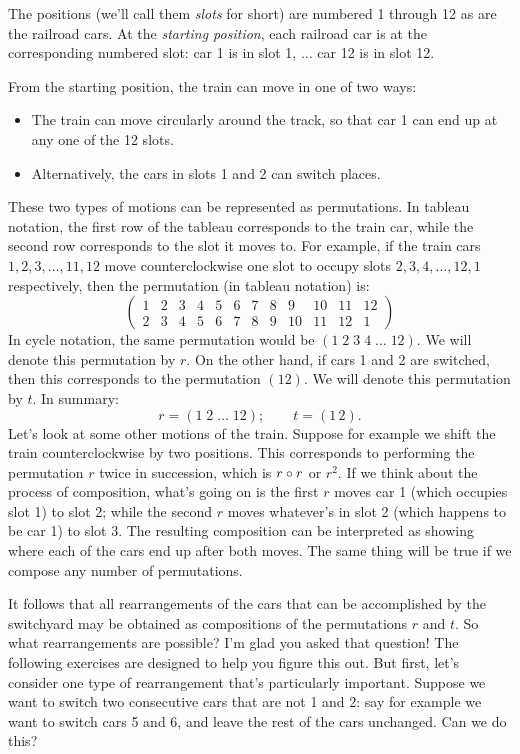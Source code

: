 The positions (we'll call them \emph{slots} for short)  are numbered 1 through 12 as are the railroad cars. At the \emph{starting position}, each railroad car is at the corresponding numbered slot: car 1 is in slot 1, $\ldots$ car 12 is in slot 12.

From the starting position, the train can move in one of two ways:
\begin{itemize}
\item
The train can move circularly around the track, so that car 1 can end up at any one of the 12 slots. 
\item
Alternatively, the cars in slots 1 and 2 can switch places. 
\end{itemize}
These two types of motions can be represented as permutations. In tableau notation, the first row of the tableau corresponds to the train car, while the second row corresponds to the slot it moves to. For example, if the train cars $1,2,3, \ldots ,11, 12$ move counterclockwise one slot to occupy slots $2,3,4,\ldots ,12,1$ respectively, then the permutation (in tableau notation) is:
\[ \left( \begin{array}{cccccccccccc}
1 & 2 & 3 & 4 & 5 & 6 & 7 & 8 & 9 & 10 & 11 & 12 \\
2 & 3 & 4 & 5 & 6 & 7 & 8 & 9 & 10 & 11 & 12 & 1
 \end{array} \right)\] 
In cycle notation,  the same permutation would be $(1 \; 2 \; 3 \; 4 \; \ldots \; 12)$.  We will denote this permutation by $r$. On the other hand, if cars 1 and 2 are switched, then this corresponds to the permutation $(1 2)$. We will denote this permutation by $t$.  In summary:
\[ r = (1 \; 2 \; \ldots \; 12);\qquad  t = (1 \, 2).\]
Let's look at some other motions of the train. Suppose for example we shift the train counterclockwise by two positions. This corresponds to performing the permutation $r$ twice in succession, which is $r \circ r$ or $r^2$.   If we think about the process of composition, what's going on is the first $r$ moves car 1 (which occupies slot 1) to slot 2; while the second $r$ moves whatever's in slot 2 (which happens to be car 1) to slot 3. The resulting composition can be interpreted as showing where each of the cars end up after both moves.  The same thing will be true  if we compose any number of permutations. 

It follows that all rearrangements of the cars that can be accomplished by the switchyard may be obtained as compositions of the permutations $r$ and $t$. So what rearrangements are possible? I'm glad you asked that question! The following exercises are designed to help you figure this out. But first, let's consider one type of rearrangement that's particularly important. Suppose we want to switch two consecutive cars that are not 1 and 2: say for example we want to switch cars 5 and 6, and leave the rest of the cars unchanged.  Can we do this? 

